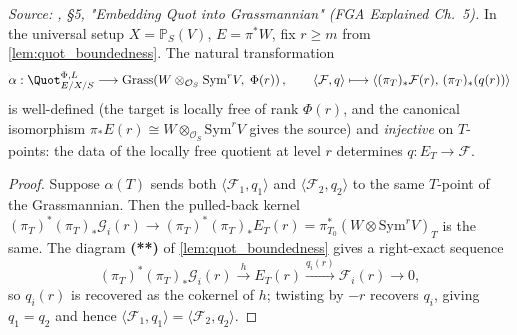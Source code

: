 \begin{lemma}
  \label{lem:quot_alpha_injective}

  \textit{Source: \cite{nitsure-hilbert-quot}, \S 5, "Embedding Quot into Grassmannian"
  (FGA Explained Ch.~5).}
  In the universal setup \(X = \mathbb{P}_S(V)\), \(E = \pi^* W\), fix
  \(r \ge m\) from \cref{lem:quot_boundedness}. The natural transformation
  \[
    \alpha :
    \Quot^{\Phi,L}_{E/X/S} \longrightarrow
    \mathrm{Grass}\!\left(
      W \otimes_{\mathcal{O}_S} \mathrm{Sym}^r V,\; \Phi(r)
    \right),
    \qquad
    \langle \mathcal{F}, q\rangle \longmapsto
    \langle (\pi_T)_*\mathcal{F}(r),\, (\pi_T)_*(q(r))\rangle
  \]
  is well-defined (the target is locally free of rank \(\Phi(r)\), and the
  canonical isomorphism \(\pi_* E(r) \cong W \otimes_{\mathcal{O}_S}
  \mathrm{Sym}^r V\) gives the source) and \emph{injective} on \(T\)-points:
  the data of the locally free quotient at level \(r\) determines
  \(q : E_T \to \mathcal{F}\).
\end{lemma}

\begin{proof}

  Suppose \(\alpha(T)\) sends both \(\langle \mathcal{F}_1, q_1\rangle\) and
  \(\langle \mathcal{F}_2, q_2\rangle\) to the same \(T\)-point of the
  Grassmannian. Then the pulled-back kernel
  \((\pi_T)^* (\pi_T)_* \mathcal{G}_i(r) \to (\pi_T)^* (\pi_T)_* E_T(r)
  = \pi_{T_0}^* (W \otimes \mathrm{Sym}^r V)_T\)
  is the same. The diagram \textbf{(**)} of
  \cref{lem:quot_boundedness} gives a right-exact sequence
  \[
    (\pi_T)^* (\pi_T)_* \mathcal{G}_i(r) \xrightarrow{h}
    E_T(r) \xrightarrow{q_i(r)} \mathcal{F}_i(r) \to 0,
  \]
  so \(q_i(r)\) is recovered as the cokernel of \(h\); twisting by \(-r\)
  recovers \(q_i\), giving \(q_1 = q_2\) and hence
  \(\langle \mathcal{F}_1, q_1\rangle = \langle \mathcal{F}_2, q_2\rangle\).
\end{proof}

